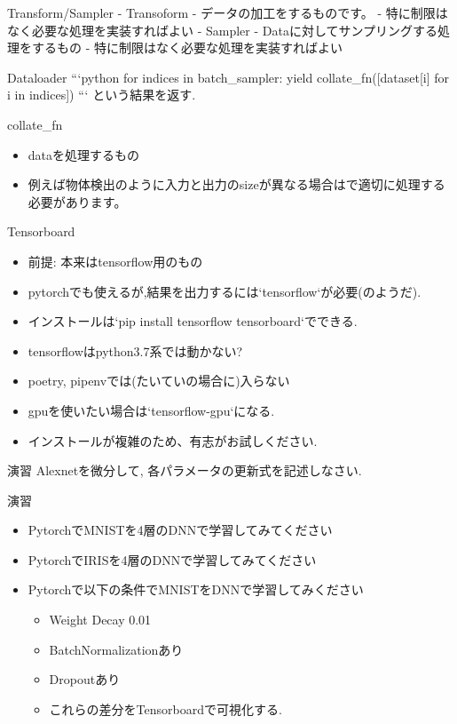 \begin{frame}[fragile]{}Transform/Sampler
- Transoform
  - データの加工をするものです。
  - 特に制限はなく必要な処理を実装すればよい
- Sampler
  - Dataに対してサンプリングする処理をするもの
  - 特に制限はなく必要な処理を実装すればよい


\end{frame}
\begin{frame}[fragile]{Dataloader}
```python
for indices in batch_sampler:
    yield collate_fn([dataset[i] for i in indices])
```
という結果を返す.

\end{frame}
\begin{frame}[fragile]{collate_fn}
\begin{itemize}
\item dataを処理するもの
\item 例えば物体検出のように入力と出力のsizeが異なる場合はで適切に処理する必要があります。
\end{itemize}

\end{frame}


\begin{frame}[fragile]{Tensorboard}
\begin{itemize}
\item 前提: 本来はtensorflow用のもの
\item pytorchでも使えるが,結果を出力するには`tensorflow`が必要(のようだ).
\item インストールは`pip install tensorflow tensorboard`でできる.
\item tensorflowはpython3.7系では動かない?
\item poetry, pipenvでは(たいていの場合に)入らない
\item gpuを使いたい場合は`tensorflow-gpu`になる.
\item インストールが複雑のため、有志がお試しください.
\end{itemize}
\end{frame}


\begin{frame}[fragile]{演習}
Alexnetを微分して,
各パラメータの更新式を記述しなさい.
\end{frame}


\begin{frame}[fragile]{演習}
\begin{itemize}
\item PytorchでMNISTを4層のDNNで学習してみてください
\item PytorchでIRISを4層のDNNで学習してみてください
\item Pytorchで以下の条件でMNISTをDNNで学習してみください
  \begin{itemize}
  \item Weight Decay 0.01
  \item BatchNormalizationあり
  \item Dropoutあり
  \item これらの差分をTensorboardで可視化する.
  \end{itemize}
\end{itemize}
\end{frame}
